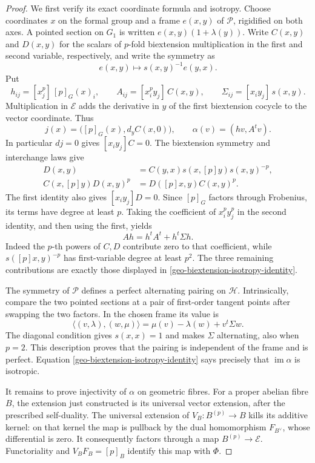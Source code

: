 \begin{proof}
We first verify its exact coordinate formula and isotropy.
Choose coordinates $x$ on the formal group and a frame $e(x,y)$
of $\mathcal P$, rigidified on both axes. A pointed section on
$G_1$ is written $e(x,y)(1+\lambda(y))$.
Write $C(x,y)$ and $D(x,y)$ for the scalars of $p$-fold
biextension multiplication in the first and second variable,
respectively, and write the symmetry as
\[
               e(x,y)\longmapsto s(x,y)^{-1}e(y,x).
\]
Put
\[
 h_{ij}=[x_j^p]\,[p]_G(x)_i,\qquad
 A_{ij}=[x_i^py_j]\,C(x,y),\qquad
 \Sigma_{ij}=[x_i y_j]\,s(x,y).
\]
Multiplication in $\mathcal E$ adds the derivative in $y$ of the
first biextension cocycle to the vector coordinate. Thus
\[
 j(x)=\bigl([p]_G(x),d_yC(x,0)\bigr),\qquad
                         \alpha(v)=(hv,A^tv).
\]
In particular $dj=0$ gives $[x_i y_j]C=0$.
The biextension symmetry and interchange laws give
\begin{align*}
 D(x,y)&=C(y,x)s(x,[p]y)s(x,y)^{-p},\\
 C(x,[p]y)D(x,y)^p&=D([p]x,y)C(x,y)^p.
\end{align*}
The first identity also gives $[x_i y_j]D=0$.
Since $[p]_G$ factors through Frobenius, its terms have degree at
least $p$. Taking the coefficient of $x_i^py_j^p$ in the second
identity, and then using the first, yields
\begin{equation}\label{geo-biextension-isotropy-identity}
                  Ah=h^tA^t+h^t\Sigma h.
\end{equation}
Indeed the $p$-th powers of $C,D$ contribute zero to that
coefficient, while $s([p]x,y)^{-p}$ has first-variable degree at
least $p^2$. The three remaining contributions are exactly those
displayed in \eqref{geo-biextension-isotropy-identity}.

The symmetry of $\mathcal P$ defines a perfect alternating
pairing on $\mathcal H$. Intrinsically, compare the two pointed
sections at a pair of first-order tangent points after swapping
the two factors. In the chosen frame its value is
\begin{equation}\label{geo-biextension-pairing}
 \langle(v,\lambda),(w,\mu)\rangle
              =\mu(v)-\lambda(w)+v^t\Sigma w.
\end{equation}
The diagonal condition gives $s(x,x)=1$ and makes $\Sigma$
alternating, also when $p=2$. This description proves that the pairing is independent
of the frame and is perfect. Equation
\eqref{geo-biextension-isotropy-identity} says precisely that
$\operatorname{im}\alpha$ is isotropic.

It remains to prove injectivity of $\alpha$ on geometric fibres.
For a proper abelian fibre $B$, the extension just constructed is
its universal vector extension, after the prescribed self-duality.
The universal extension of $V_B:B^{(p)}\to B$ kills its additive
kernel: on that kernel the map is pullback by the dual
homomorphism $F_{B^\vee}$, whose differential is zero.
It consequently factors through a map $B^{(p)}\to\mathcal E$.
Functoriality and $V_BF_B=[p]_B$ identify this map with $\Phi$.


\end{proof}
